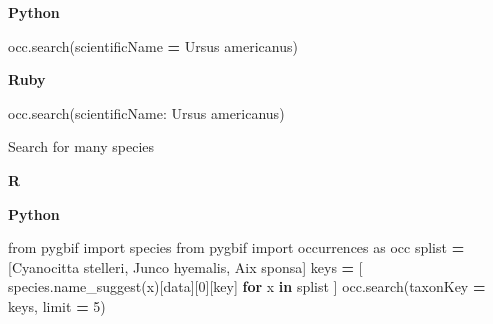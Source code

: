 \documentclass[3p]{elsarticle} %
\newenvironment{Shaded}{\begin{snugshade}}{\end{snugshade}}
\newcommand{\ControlFlowTok}[1]{\textcolor[rgb]{0.13,0.29,0.53}{\textbf{#1}}}
\newcommand{\DataTypeTok}[1]{\textcolor[rgb]{0.13,0.29,0.53}{#1}}
\newcommand{\DecValTok}[1]{\textcolor[rgb]{0.00,0.00,0.81}{#1}}
\newcommand{\ImportTok}[1]{#1}
\newcommand{\KeywordTok}[1]{\textcolor[rgb]{0.13,0.29,0.53}{\textbf{#1}}}
\newcommand{\NormalTok}[1]{#1}
\newcommand{\OperatorTok}[1]{\textcolor[rgb]{0.81,0.36,0.00}{\textbf{#1}}}
\newcommand{\OtherTok}[1]{\textcolor[rgb]{0.56,0.35,0.01}{#1}}
\newcommand{\StringTok}[1]{\textcolor[rgb]{0.31,0.60,0.02}{#1}}
\begin{document}
\textbf{Python}

\begin{Shaded}
\begin{Highlighting}[]
\NormalTok{occ.search(scientificName }\OperatorTok{=} \StringTok{\textquotesingle{}Ursus americanus\textquotesingle{}}\NormalTok{)}
\end{Highlighting}
\end{Shaded}

\textbf{Ruby}

\begin{Shaded}
\begin{Highlighting}[]
\NormalTok{occ.search(}\StringTok{scientificName: \textquotesingle{}Ursus americanus\textquotesingle{}}\NormalTok{)}
\end{Highlighting}
\end{Shaded}

Search for many species

\textbf{R}

\begin{Shaded}
\end{Shaded}

\textbf{Python}

\begin{Shaded}
\begin{Highlighting}[]
\ImportTok{from}\NormalTok{ pygbif }\ImportTok{import}\NormalTok{ species}
\ImportTok{from}\NormalTok{ pygbif }\ImportTok{import}\NormalTok{ occurrences }\ImportTok{as}\NormalTok{ occ}
\NormalTok{splist }\OperatorTok{=}\NormalTok{ [}\StringTok{\textquotesingle{}Cyanocitta stelleri\textquotesingle{}}\NormalTok{, }\StringTok{\textquotesingle{}Junco hyemalis\textquotesingle{}}\NormalTok{, }\StringTok{\textquotesingle{}Aix sponsa\textquotesingle{}}\NormalTok{]}
\NormalTok{keys }\OperatorTok{=}\NormalTok{ [ species.name\_suggest(x)[}\StringTok{\textquotesingle{}data\textquotesingle{}}\NormalTok{][}\DecValTok{0}\NormalTok{][}\StringTok{\textquotesingle{}key\textquotesingle{}}\NormalTok{] }\ControlFlowTok{for}\NormalTok{ x }\KeywordTok{in}\NormalTok{ splist ]}
\NormalTok{occ.search(taxonKey }\OperatorTok{=}\NormalTok{ keys, limit }\OperatorTok{=} \DecValTok{5}\NormalTok{)}
\end{Highlighting}
\end{Shaded}
\end{document}
